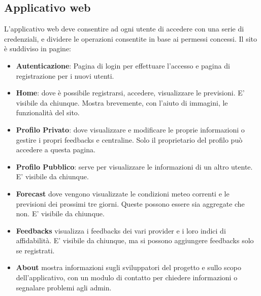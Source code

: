         \subsection{Applicativo web}
        L'applicativo web deve consentire ad ogni utente di accedere con una serie di credenziali, e dividere le operazioni consentite in base ai permessi concessi.
        Il sito è suddiviso in pagine:
        \begin{itemize}
            \item \textbf{Autenticazione}:
                Pagina di login per effettuare l'accesso e pagina di registrazione per i nuovi utenti.
            
            \item \textbf{Home}:
                dove è possibile registrarsi, accedere, visualizzare le previsioni. E' visibile da chiunque. Mostra brevemente, con l'aiuto di immagini, le funzionalità del sito.
                
            \item \textbf{Profilo Privato}:
                dove visualizzare e modificare le proprie informazioni o gestire i propri feedbacks e centraline. Solo il proprietario del profilo può accedere a questa pagina.
            
            \item \textbf{Profilo Pubblico}:
                serve per visualizzare le informazioni di un altro utente. E' visibile da chiunque.
                
            \item \textbf{Forecast}
                dove vengono visualizzate le condizioni meteo correnti e le previsioni dei prossimi tre giorni. Queste possono essere sia aggregate che non. E' visibile da chiunque.
              
            \item \textbf{Feedbacks} 
                visualizza i feedbacks dei vari provider e i loro indici di affidabilità. E' visibile da chiunque, ma si possono aggiungere feedbacks solo se registrati. 
              
            \item \textbf{About} 
                mostra informazioni sugli sviluppatori del progetto e sullo scopo dell'applicativo, con un modulo di contatto per chiedere informazioni o segnalare problemi agli admin.
            
        \end{itemize}
        
